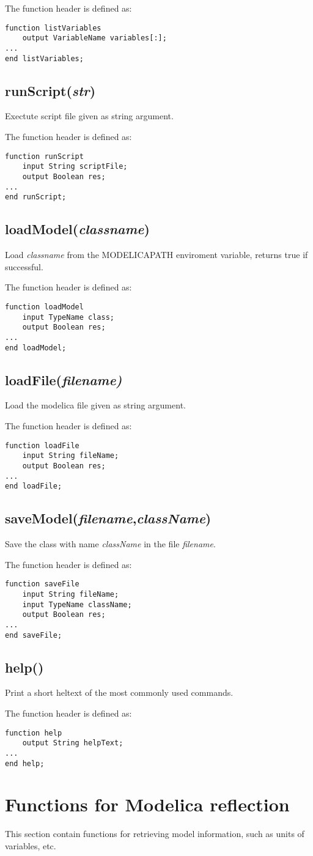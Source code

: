 \documentclass{report}
\newcommand{\func}[1]{\section{#1}}
\newcommand{\funcend}{}
\begin{document}
The function header is defined as:
\begin{verbatim}
function listVariables
    output VariableName variables[:];
...
end listVariables;
\end{verbatim}
\func{runScript(\emph{str})} Exectute script file given as string argument.

The function header is defined as:
\begin{verbatim}
function runScript
    input String scriptFile;
    output Boolean res;
...
end runScript;
\end{verbatim}

\func{loadModel(\emph{classname})}  
Load \emph{classname} from the MODELICAPATH enviroment variable,
returns true if successful.

The function header is defined as:
\begin{verbatim}
function loadModel
    input TypeName class;
    output Boolean res;
...
end loadModel;
\end{verbatim}

\func{loadFile(\emph{filename)}} Load the modelica file given as string argument.

The function header is defined as:
\begin{verbatim}
function loadFile
    input String fileName;
    output Boolean res;
...
end loadFile;
\end{verbatim}

\func{saveModel(\emph{filename},\emph{className})} 
Save the class with name \emph{className} in the file \emph{filename}.

The function header is defined as:
\begin{verbatim}
function saveFile
    input String fileName;
    input TypeName className;
    output Boolean res;
...
end saveFile;
\end{verbatim}
\func{help()} Print a short heltext of the most commonly used
commands.

The function header is defined as:
\begin{verbatim}
function help
    output String helpText;
...
end help;
\end{verbatim}
\funcend

\chapter{Functions for Modelica reflection}
This section contain functions for retrieving model information, such
as units of variables, etc.
\end{document}
